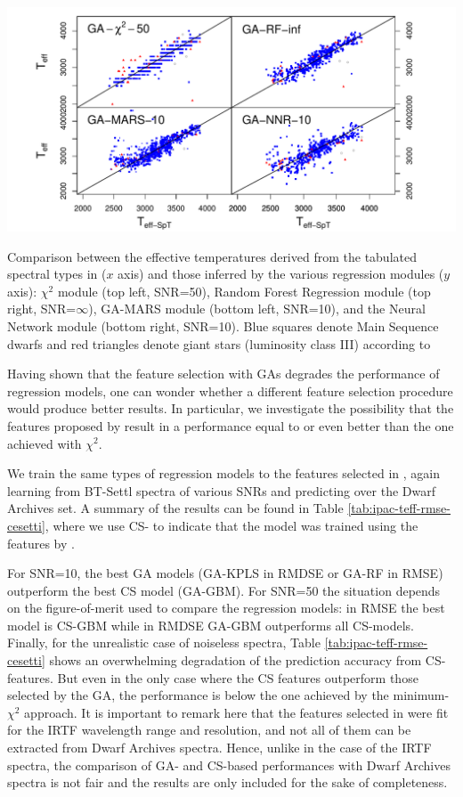 \begin {figure*}
\centering \includegraphics[width=\textwidth]{figs/ipac-teff}
\caption{Comparison
 between the effective temperatures derived from the tabulated
 spectral types in \protect\cite{cesetti} ($x$ axis) and those
 inferred by the various regression modules ($y$ axis): $\chi^2$
 module (top left, SNR=50), Random Forest Regression module (top
 right, SNR=$\infty$), GA-MARS module (bottom left, SNR=10), and the
 Neural Network module (bottom right, SNR=10).  Blue squares denote
 Main Sequence dwarfs and red triangles denote giant stars (luminosity
 class III) according to \protect\cite{cesetti}} \label{fig:ipac_teff}
\end {figure*}

Having shown that the feature selection with GAs degrades the
performance of regression models, one can wonder whether a different
feature selection procedure would produce better results. In
particular, we investigate the possibility that the features proposed
by \cite{cesetti} result in a performance equal to or even better than
the one achieved with $\chi^2$.

We train the same types of regression models to the features selected
in \cite{cesetti}, again learning from BT-Settl spectra of various
SNRs and predicting over the Dwarf Archives set. A summary of the results can be
found in Table \ref{tab:ipac-teff-rmse-cesetti}, where we use CS- to
indicate that the model was trained using the features
by \cite{cesetti}. 

For SNR=10, the best GA models (GA-KPLS in RMDSE or GA-RF in RMSE)
outperform the best CS model (GA-GBM). For SNR=50 the situation
depends on the figure-of-merit used to compare the regression models:
in RMSE the best model is CS-GBM while in RMDSE GA-GBM outperforms all
CS-models. Finally, for the unrealistic case of noiseless spectra,
Table \ref{tab:ipac-teff-rmse-cesetti} shows an overwhelming
degradation of the prediction accuracy from CS- features. But even in
the only case where the CS features outperform those selected by the
GA, the performance is below the one achieved by the minimum-$\chi^2$
approach. It is important to remark here that the features selected
in \cite{cesetti} were fit for the IRTF wavelength range and
resolution, and not all of them can be extracted from Dwarf Archives 
spectra. Hence, unlike in the case of the IRTF spectra, the comparison
of GA- and CS-based performances with Dwarf Archives spectra is not fair and the
results are only included for the sake of completeness.

